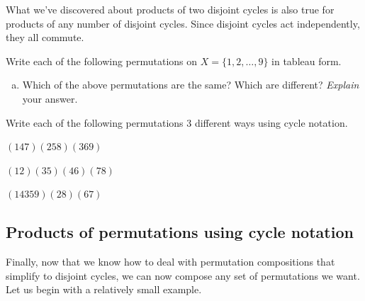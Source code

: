 \noindent
What we've discovered about products of two disjoint cycles is also true for products of any number of disjoint cycles. Since disjoint cycles act independently, they all commute.

\begin{exercise}{}
Write each of the following permutations on $X = \{1,2,\ldots,9\}$ in tableau form.
\begin{enumerate}[(a)]
\item
Which of the above permutations are the same? Which are different? \emph{Explain} your answer.
\end{enumerate}
\end{exercise}

\begin{exercise}{}
Write each of the following permutations 3 different ways using cycle notation.
\begin{enumerate}[(a)]
\begin{multicols}{3}
\item
$(147)(258)(369)$
\item
$(12)(35)(46)(78)$
\item
$(14359)(28)(67)$
\end{multicols}
\end{enumerate}
\end{exercise}


\subsection{Products of permutations using cycle notation}
Finally, now that we know how to deal with permutation compositions that simplify to disjoint cycles, we can now compose any set of permutations we want.  Let us begin with a relatively small example.

